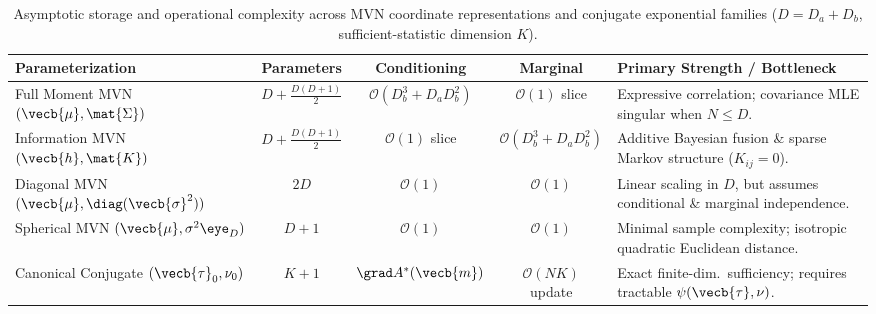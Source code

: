 \documentclass[../../../../master.tex]{subfiles}
\begin{document}
\begin{table}[htbp]
\centering
\small
\begin{tabularx}{\textwidth}{@{}>{\raggedright\arraybackslash}p{3.15cm}ccc>{\raggedright\arraybackslash}X@{}}
  \toprule
  \textbf{Parameterization} & \textbf{Parameters} & \textbf{Conditioning} & \textbf{Marginal} & \textbf{Primary Strength / Bottleneck} \\
  \midrule
  Full Moment MVN $(\vecb{\mu}, \mat{\Sigma})$
    & $D + \frac{D(D+1)}{2}$
    & $\mathcal{O}(D_b^3 + D_a D_b^2)$
    & $\mathcal{O}(1)$ slice
    & Expressive correlation; covariance MLE singular when $N \le D$. \\
  Information MVN $(\vecb{h}, \mat{K})$
    & $D + \frac{D(D+1)}{2}$
    & $\mathcal{O}(1)$ slice
    & $\mathcal{O}(D_b^3 + D_a D_b^2)$
    & Additive Bayesian fusion \& sparse Markov structure ($K_{ij}=0$). \\
  Diagonal MVN $(\vecb{\mu}, \diag(\vecb{\sigma}^2))$
    & $2D$
    & $\mathcal{O}(1)$
    & $\mathcal{O}(1)$
    & Linear scaling in $D$, but assumes conditional \& marginal independence. \\
  Spherical MVN $(\vecb{\mu}, \sigma^2 \eye_D)$
    & $D + 1$
    & $\mathcal{O}(1)$
    & $\mathcal{O}(1)$
    & Minimal sample complexity; isotropic quadratic Euclidean distance. \\
  Canonical Conjugate $(\vecb{\tau}_0, \nu_0)$
    & $K + 1$
    & $\grad A^*(\vecb{m})$
    & $\mathcal{O}(NK)$ update
    & Exact finite-dim.\ sufficiency; requires tractable $\psi(\vecb{\tau},\nu)$. \\
  \bottomrule
\end{tabularx}
\caption{Asymptotic storage and operational complexity across MVN coordinate representations and conjugate exponential families ($D = D_a + D_b$, sufficient-statistic dimension $K$).}
\label{tab:probdist:complexity}
\end{table}
\end{document}
